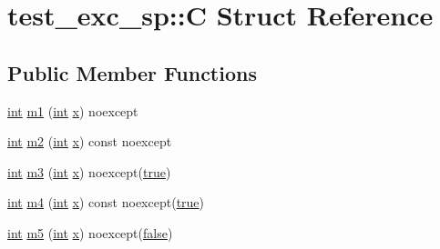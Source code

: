 \hypertarget{structtest__exc__sp_1_1_c}{}\section{test\+\_\+exc\+\_\+sp\+::C Struct Reference}
\label{structtest__exc__sp_1_1_c}
\subsection*{Public Member Functions}
\begin{DoxyCompactItemize}
\item 
\mbox{\hyperlink{warnings_8h_a74f207b5aa4ba51c3a2ad59b219a423b}{int}} \mbox{\hyperlink{structtest__exc__sp_1_1_c_a6d40a55c112d67cb1e7eed95998fee66}{m1}} (\mbox{\hyperlink{warnings_8h_a74f207b5aa4ba51c3a2ad59b219a423b}{int}} \mbox{\hyperlink{_s_d_l__opengl_8h_ad0e63d0edcdbd3d79554076bf309fd47}{x}}) noexcept
\item 
\mbox{\hyperlink{warnings_8h_a74f207b5aa4ba51c3a2ad59b219a423b}{int}} \mbox{\hyperlink{structtest__exc__sp_1_1_c_aecf03f1641a2c17d698a2d9715919abd}{m2}} (\mbox{\hyperlink{warnings_8h_a74f207b5aa4ba51c3a2ad59b219a423b}{int}} \mbox{\hyperlink{_s_d_l__opengl_8h_ad0e63d0edcdbd3d79554076bf309fd47}{x}}) const noexcept
\item 
\mbox{\hyperlink{warnings_8h_a74f207b5aa4ba51c3a2ad59b219a423b}{int}} \mbox{\hyperlink{structtest__exc__sp_1_1_c_ac710cb422450c70585abd1a26641e683}{m3}} (\mbox{\hyperlink{warnings_8h_a74f207b5aa4ba51c3a2ad59b219a423b}{int}} \mbox{\hyperlink{_s_d_l__opengl_8h_ad0e63d0edcdbd3d79554076bf309fd47}{x}}) noexcept(\mbox{\hyperlink{asdl_8h_af6a258d8f3ee5206d682d799316314b1a08f175a5505a10b9ed657defeb050e4b}{true}})
\item 
\mbox{\hyperlink{warnings_8h_a74f207b5aa4ba51c3a2ad59b219a423b}{int}} \mbox{\hyperlink{structtest__exc__sp_1_1_c_a1a5298013346f83e1d5533a37df5f6ab}{m4}} (\mbox{\hyperlink{warnings_8h_a74f207b5aa4ba51c3a2ad59b219a423b}{int}} \mbox{\hyperlink{_s_d_l__opengl_8h_ad0e63d0edcdbd3d79554076bf309fd47}{x}}) const noexcept(\mbox{\hyperlink{asdl_8h_af6a258d8f3ee5206d682d799316314b1a08f175a5505a10b9ed657defeb050e4b}{true}})
\item 
\mbox{\hyperlink{warnings_8h_a74f207b5aa4ba51c3a2ad59b219a423b}{int}} \mbox{\hyperlink{structtest__exc__sp_1_1_c_ae2b8765fddc7698f930782f74307b794}{m5}} (\mbox{\hyperlink{warnings_8h_a74f207b5aa4ba51c3a2ad59b219a423b}{int}} \mbox{\hyperlink{_s_d_l__opengl_8h_ad0e63d0edcdbd3d79554076bf309fd47}{x}}) noexcept(\mbox{\hyperlink{asdl_8h_af6a258d8f3ee5206d682d799316314b1ae9de385ef6fe9bf3360d1038396b884c}{false}})

\end{DoxyCompactItemize}
